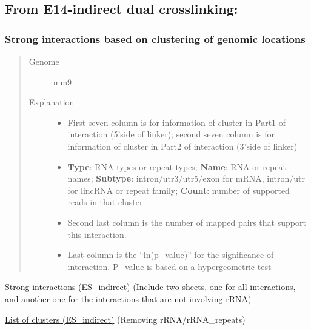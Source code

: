 \documentclass[letterpaper,10pt,english]{sphinxmanual}
\begin{document}
\subsection{From E14-indirect dual crosslinking:}
\label{Data_Resources:from-e14-indirect-dual-crosslinking}

\subsubsection{Strong interactions based on clustering of genomic locations}
\label{Data_Resources:id1}\begin{quote}\begin{description}
\item[{Genome}] \leavevmode
mm9

\item[{Explanation}] \leavevmode\begin{itemize}
\item {} 
First seven column is for information of cluster in Part1 of interaction (5'side of linker); second seven column is for information of cluster in Part2 of interaction (3'side of linker)

\item {} 
\textbf{Type}: RNA types or repeat types; \textbf{Name}: RNA or repeat names; \textbf{Subtype}: intron/utr3/utr5/exon for mRNA, intron/utr for lincRNA or repeat family; \textbf{Count}: number of supported reads in that cluster

\item {} 
Second last column is the number of mapped pairs that support this interaction.

\item {} 
Last column is the ``ln(p\_value)'' for the significance of interaction. P\_value is based on a hypergeometric test

\end{itemize}

\end{description}\end{quote}

\href{http://systemsbio.ucsd.edu/RNA-Hi-C/Data/AATG\_interaction\_clusters.xlsx}{Strong interactions (ES\_indirect)} (Include two sheets, one for all interactions, and another one for the interactions that are not involving rRNA)

\href{http://systemsbio.ucsd.edu/RNA-Hi-C/Data/AATG\_cluster\_total\_sort.xlsx}{List of clusters (ES\_indirect)} (Removing rRNA/rRNA\_repeats)
\end{document}
